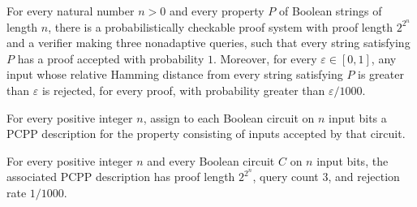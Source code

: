 \begin{theorem}
\label{FABL.exists_arbitraryPropertyPCPPSystem}
\leanok
{}
For every natural number $n>0$ and every property $P$ of Boolean strings of length $n$,
there is a probabilistically checkable proof system with proof length $2^{2^n}$ and a
verifier making three nonadaptive queries, such that every string satisfying $P$ has a
proof accepted with probability $1$. Moreover, for every $\varepsilon\in[0,1]$, any
input whose relative Hamming distance from every string satisfying $P$ is greater than
$\varepsilon$ is rejected, for every proof, with probability greater than
$\varepsilon/1000$.
\end{theorem}

\begin{definition}
\label{FABL.exhaustiveCircuitSemanticPCPPReduction}
\leanok
{}
For every positive integer $n$, assign to each Boolean circuit on $n$ input bits a PCPP
description for the property consisting of inputs accepted by that circuit.
\end{definition}

\begin{theorem}
\label{FABL.exhaustiveCircuitSemanticPCPPReduction_resources}
\leanok
{}
For every positive integer $n$ and every Boolean circuit $C$ on $n$ input bits, the
associated PCPP description has proof length $2^{2^n}$, query count $3$, and rejection
rate $1/1000$.
\end{theorem}

